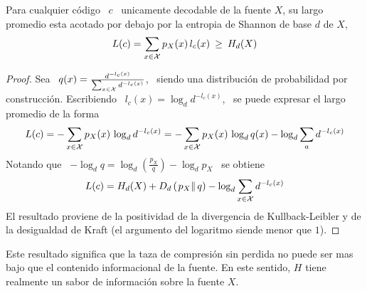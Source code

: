 \begin{teorema}
  Para cualquier  c\'odigo \  $c$ \  unicamente decodable de  la fuente  $X$, su
  largo promedio esta acotado por debajo  por la entropia de Shannon de base $d$
  de $X$,
  \[
  L(c) = \sum_{x \in \mathcal{X}} p_X(x) \, l_c(x) \: \ge \: H_d(X)
  \]
\end{teorema}
%
\begin{proof}
  Sea \ $q(x)  = \frac{d^{-l_c(x)}}{\sum_{x \in \mathcal{X}} d^{-l_c(x)}}$,  \ siendo una
  distribuci\'on de  probabilidad por  construcci\'on.  Escribiendo \  $l_c(x) =
  \log_d d^{-l_c(x)}$, \ se puede expresar el largo promedio de la forma
  \[
  L(c) =  - \sum_{x  \in \mathcal{X}}  p_X(x) \, \log_d  d^{-l_c(x)} =  - \sum_{x  \in \mathcal{X}}
  p_X(x) \, \log_d q(x) - \log_d \sum_a d^{-l_c(x)}
  \]
  Notando que \ $- \log_d q  = \log_d \left( \frac{p_X}{q} \right) - \log_d p_X$
  \ se obtiene
  \[
  L(c) = H_d(X)  + D_d\left( \left.  p_X \right\| q \right)  - \log_d \sum_{x \in
    \mathcal{X}} d^{-l_c(x)}
  \]
  El resultado proviene de la  positividad de la divergencia de Kullback-Leibler
  y de  la desigualdad  de Kraft  (el argumento del  logaritmo siende  menor que
  $1$).
\end{proof}
%
\noindent Este  resultado significa que la  taza de compresi\'on  sin perdida no
puede ser mas bajo que el contenido informacional de la fuente. En este sentido,
$H$ tiene realmente un sabor de informaci\'on sobre la fuente $X$.

